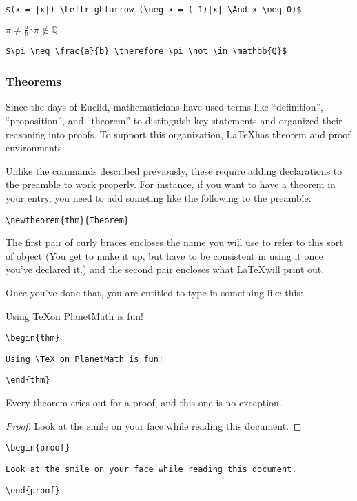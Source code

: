 \smallskip

\verb'$(x = |x|) \Leftrightarrow (\neg x = (-1)|x| \And x \neq 0)$'

\medskip

$\pi \neq \frac{a}{b} \therefore \pi \not \in \mathbb{Q}$

\smallskip

\verb=$\pi \neq \frac{a}{b} \therefore \pi \not \in \mathbb{Q}$=

\subsubsection{Theorems}

Since the days of Euclid, mathematicians have used terms like ``definition'', ``proposition'', and ``theorem'' to distinguish key statements and organized their reasoning into proofs.  To support this organization, \LaTeX has theorem and proof environments.

Unlike the commands described previously, these require adding declarations to the preamble to work properly.  For instance, if you want to have a theorem in your entry, you need to add someting like the following to the preamble:

\medskip

\verb"\newtheorem{thm}{Theorem}"

\bigskip

The first pair of curly braces encloses the name you will use to refer to this sort of object (You get to make it up, but have to be consistent in using it once you've declared it.) and the second pair encloses what \LaTeX will print out.

Once you've done that, you are entitled to type in something like this:

\begin{thm}
Using \TeX on PlanetMath is fun!
\end{thm}

\smallskip

\verb"\begin{thm}"

\verb"Using \TeX on PlanetMath is fun!"

\verb"\end{thm}"

\bigskip

Every theorem cries out for a proof, and this one is no exception.

\medskip

\begin{proof}
Look at the smile on your face while reading this document.
\end{proof}

\smallskip

\verb"\begin{proof}"

\verb"Look at the smile on your face while reading this document."

\verb"\end{proof}"
